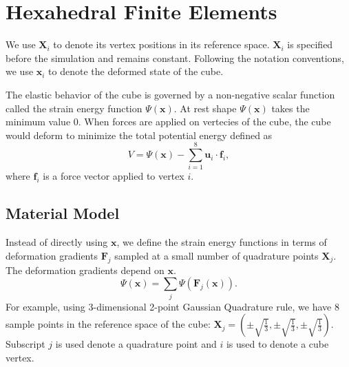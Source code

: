 \documentclass{article}
\newcommand{\mbF}{\mathbf{F}}
\newcommand{\mbX}{\mathbf{X}}
\newcommand{\mbx}{\mathbf{x}}
\newcommand{\mbf}{\mathbf{f}}
\newcommand{\mbu}{\mathbf{u}}
\begin{document}
	\section{Hexahedral Finite Elements}
We use $\mbX_i$ to denote its vertex positions in its reference space.
	$\mbX_i$ is specified before the simulation and remains constant.
	Following the notation conventions, we use $\mbx_i$ to denote the deformed state
	of the cube.
	
	The elastic behavior of the cube is governed by a non-negative scalar function called the strain energy function $\Psi(\mbx)$.
	At rest shape $\Psi(\mbx)$ takes the minimum value $0$. When forces are applied on vertecies of the cube, the
	cube would deform to minimize the total potential energy defined as
	\begin{equation}
	V=\Psi(\mbx) - \sum_{i=1}^8\mbu_i\cdot \mbf_i,
	\label{eq:pot}
	\end{equation}
	where $\mbf_i$ is a force vector applied to vertex $i$.
	\subsection{Material Model}
	Instead of directly using $\mbx$, 
	we define the strain energy functions in terms of deformation gradients $\mbF_j$
	sampled at a small number of quadrature points $\mbX_j$. The deformation gradients
	depend on $\mbx$.
	\[\Psi(\mbx) = \sum_j \Psi(\mbF_j(\mbx)).\]
	For example, using 3-dimensional
	2-point Gaussian Quadrature rule, we have $8$ sample points in the reference space of the cube:
	$\mbX_j=(\pm\sqrt{\frac{1}{3}}, \pm\sqrt{\frac{1}{3}},\pm\sqrt{\frac{1}{3}})$. Subscript $j$ is used
	denote a quadrature point and $i$ is used to denote a cube vertex.
	
\end{document}
